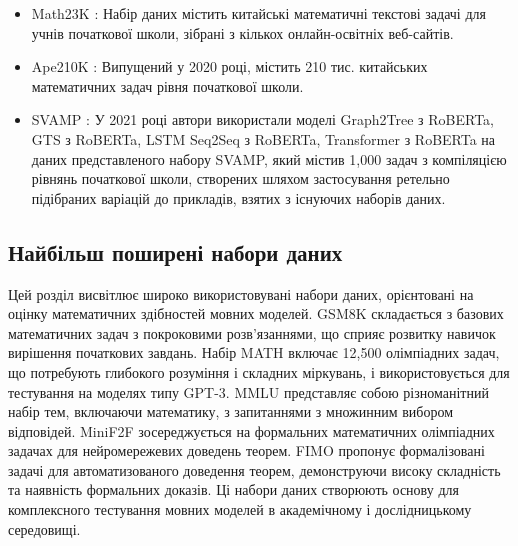 \begin{itemize}
    \item {Math23K} \cite{wang-etal-2017-deep}: Набір даних містить китайські математичні текстові задачі для учнів початкової школи, зібрані з кількох онлайн-освітніх веб-сайтів.

    \item {Ape210K} \cite{zhao2020ape210klargescaletemplaterichdataset}: Випущений у 2020 році, містить 210 тис. китайських математичних задач рівня початкової школи.
    
    \item {SVAMP} \cite{patel-etal-2021-nlp}: У 2021 році автори використали моделі Graph2Tree з RoBERTa, GTS з RoBERTa, LSTM Seq2Seq з RoBERTa, Transformer з RoBERTa на даних представленого набору SVAMP, який містив 1,000 задач з компіляцією рівнянь початкової школи, створених шляхом застосування ретельно підібраних варіацій до прикладів, взятих з існуючих наборів даних.
    \end{itemize}

\subsection{Найбільш поширені набори даних}

Цей розділ висвітлює широко використовувані набори даних, орієнтовані на оцінку математичних здібностей мовних моделей. GSM8K складається з базових математичних задач з покроковими розв'язаннями, що сприяє розвитку навичок вирішення початкових завдань. Набір MATH включає 12,500 олімпіадних задач, що потребують глибокого розуміння і складних міркувань, і використовується для тестування на моделях типу GPT-3. MMLU представляє собою різноманітний набір тем, включаючи математику, з запитаннями з множинним вибором відповідей. MiniF2F зосереджується на формальних математичних олімпіадних задачах для нейромережевих доведень теорем. FIMO пропонує формалізовані задачі для автоматизованого доведення теорем, демонструючи високу складність та наявність формальних доказів. Ці набори даних створюють основу для комплексного тестування мовних моделей в академічному і дослідницькому середовищі.


